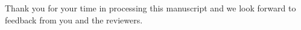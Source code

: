 \documentclass[10pt,stdletter,dateleft,sigleft,orderfromtodate]{newlfm} %
\begin{document}
\begin{newlfm}

Thank you for your time in processing this manuscript and we look forward to
feedback from you and the reviewers.


 



\end{newlfm}
\end{document}
